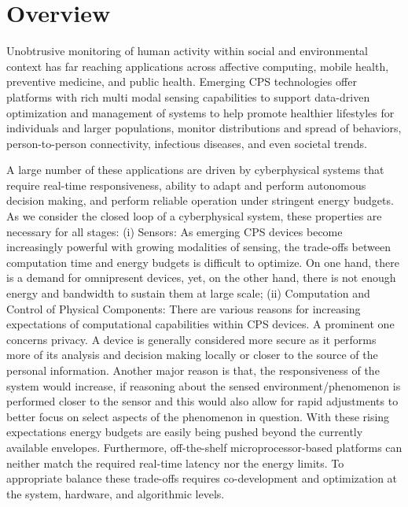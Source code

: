\section{Overview}\label{sec.overview}
Unobtrusive monitoring of human activity within social and environmental context has far reaching applications across affective computing, mobile health, preventive medicine, and public health. 
Emerging CPS technologies offer platforms with rich multi modal sensing capabilities to support data-driven optimization and management of systems to help promote healthier lifestyles for individuals and larger populations, monitor distributions and spread of behaviors, person-to-person connectivity, infectious diseases, and even societal trends. 

A large number of these applications are driven by cyberphysical systems that require real-time responsiveness, ability to adapt and perform autonomous decision making, and perform reliable operation under stringent energy budgets. 
As we consider the closed loop of a cyberphysical system, these properties are necessary for all stages: (i) Sensors: As emerging CPS devices become increasingly powerful with growing modalities of sensing, the trade-offs between computation time and energy budgets is difficult to optimize. On one hand, there is a demand for omnipresent devices, yet, on the other hand, there is not enough energy and bandwidth to sustain them at large scale; 
(ii) Computation and Control of Physical Components: There are various reasons for increasing expectations of computational capabilities within CPS devices.
A prominent one concerns privacy. A device is generally considered more secure as it performs more of its analysis and decision making locally or closer to the source of the personal information. 
Another major reason is that, the responsiveness of the system would increase, if reasoning about the sensed environment/phenomenon is performed closer to the sensor and this would also allow for rapid adjustments to better focus on select aspects of the phenomenon in question. 
With these rising expectations energy budgets are easily being pushed beyond the currently available envelopes. 
Furthermore, off-the-shelf microprocessor-based platforms can neither match the required real-time latency nor the energy limits. 
To appropriate balance these trade-offs requires  co-development and optimization at the system, hardware, and algorithmic levels.

